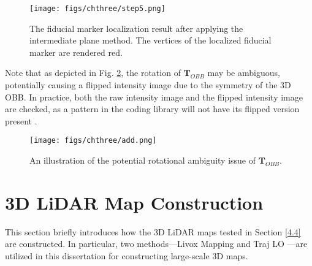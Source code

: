 \begin{figure}[H] 
	\centering
\texttt{[image: figs/chthree/step5.png]}
	\caption{The fiducial marker localization result after applying the intermediate plane method. The vertices of the localized fiducial marker are rendered red.}
	\label{step5}
\end{figure} 
\par
Note that as depicted in Fig. \ref{add}, the rotation of $\mathbf{T}_{OBB}$ may be ambiguous, potentially causing a flipped intensity image due to the symmetry of the 3D OBB. In practice, both the raw intensity image and the flipped intensity image are checked, as a pattern in the coding library will not have its flipped version present \cite{ap3,aruco}.
\begin{figure}[H] 
	\centering
\texttt{[image: figs/chthree/add.png]}
	\caption{An illustration of the potential rotational ambiguity issue of $\mathbf{T}_{OBB}$.}
	\label{add}
\end{figure} 

\section{3D LiDAR Map Construction} \label{new4.4}
This section briefly introduces how the 3D LiDAR maps tested in Section \ref{4.4} are constructed. In particular, two methods—Livox Mapping \cite{sdk} and Traj LO \cite{traj}—are utilized in this dissertation for constructing large-scale 3D maps.
